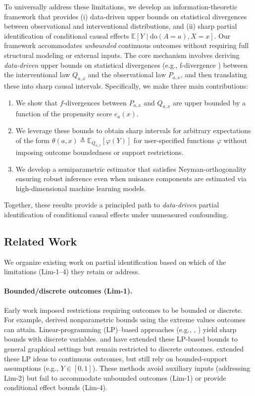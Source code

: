 To universally address these limitations, we develop an information-theoretic framework that provides (i) data-driven upper bounds on statistical divergences between observational and interventional distributions, and (ii) sharp partial identification of conditional causal effects $\mathbb{E}[Y \mid \mathrm{do}(A=a),X=x]$. Our framework accommodates \textit{unbounded} continuous outcomes without requiring full structural modeling or external inputs. The core mechanism involves deriving \textit{data-driven} upper bounds on statistical divergences (e.g., f-divergence \citep{csiszar1967fdivergenceDPI}) between the interventional law $Q_{a,x}$ and the observational law $P_{a,x}$, and then translating these into sharp causal intervals. Specifically, we make three main contributions:
\begin{enumerate}[leftmargin=*, itemsep=0pt, topsep=0pt, label=(\roman*)]
    \item We show that $f$-divergences \citep{csiszar1967fdivergenceDPI} between $P_{a,x}$ and $Q_{a,x}$ are upper bounded by a function of the propensity score $e_a(x)$.
    \item We leverage these bounds to obtain sharp intervals for arbitrary expectations of the form $\theta(a,x)\triangleq \mathbb{E}_{Q_{a,x}}[\varphi(Y)]$ for user-specified functions $\varphi$ without imposing outcome boundedness or support restrictions.
    \item We develop a semiparametric estimator that satisfies Neyman-orthogonality \citep{chernozhukov2018double} ensuring robust inference even when nuisance components are estimated via high-dimensional machine learning models.
\end{enumerate}
Together, these results provide a principled path to \textit{data-driven} partial identification of conditional causal effects under unmeasured confounding.

\subsection{Related Work} \label{subsec:related}
We organize existing work on partial identification based on which of the limitations (Lim-1--4) they retain or address. 

\paragraph{Bounded/discrete outcomes (Lim-1).} Early work imposed restrictions requiring outcomes to be bounded or discrete. For example, \citet{manski1990nonparametric} derived nonparametric bounds using the extreme values outcomes can attain. Linear-programming (LP)–based approaches (e.g., \citet{balke1994counterfactual}, \citet{tian2000probabilities}) yield sharp bounds with discrete variables. \citet{sachs2023general} and \citet{shridharan2023scalable} have extended these LP-based bounds to general graphical settings but remain restricted to discrete outcomes. \citet{zhang2021bounding} extended these LP ideas to continuous outcomes, but still rely on bounded-support assumptions (e.g., $Y \in [0,1]$). These methods avoid auxiliary inputs (addressing Lim-2) but fail to accommodate unbounded outcomes (Lim-1) or provide conditional effect bounds (Lim-4).

